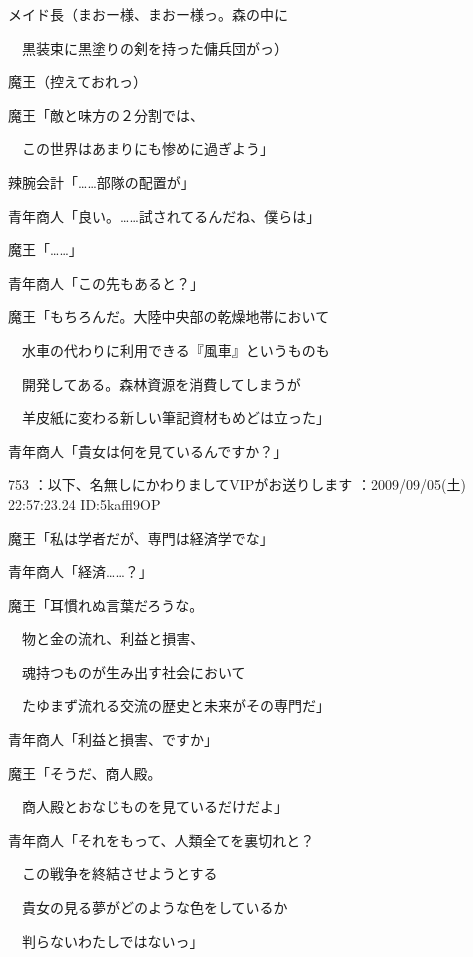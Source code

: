 \documentclass[a4j,twocolumn]{tarticle}
\begin{document}
メイド長（まおー様、まおー様っ。森の中に\par{} 
　黒装束に黒塗りの剣を持った傭兵団がっ）\par{} 
魔王（控えておれっ） 



魔王「敵と味方の２分割では、\par{} 
　この世界はあまりにも惨めに過ぎよう」 



辣腕会計「……部隊の配置が」\par{} 
青年商人「良い。……試されてるんだね、僕らは」 



魔王「……」 



青年商人「この先もあると？」 



魔王「もちろんだ。大陸中央部の乾燥地帯において\par{} 
　水車の代わりに利用できる『風車』というものも\par{} 
　開発してある。森林資源を消費してしまうが\par{} 
　羊皮紙に変わる新しい筆記資材もめどは立った」 



青年商人「貴女は何を見ているんですか？」 

	
    
    

753 ：以下、名無しにかわりましてVIPがお送りします ：2009/09/05(土) 22:57:23.24 ID:5kaffl9OP 


魔王「私は学者だが、専門は経済学でな」 



青年商人「経済……？」 



魔王「耳慣れぬ言葉だろうな。\par{} 
　物と金の流れ、利益と損害、\par{} 
　魂持つものが生み出す社会において\par{} 
　たゆまず流れる交流の歴史と未来がその専門だ」 



青年商人「利益と損害、ですか」 



魔王「そうだ、商人殿。\par{} 
　商人殿とおなじものを見ているだけだよ」 



青年商人「それをもって、人類全てを裏切れと？\par{} 
　この戦争を終結させようとする\par{} 
　貴女の見る夢がどのような色をしているか\par{} 
　判らないわたしではないっ」 
\end{document}
